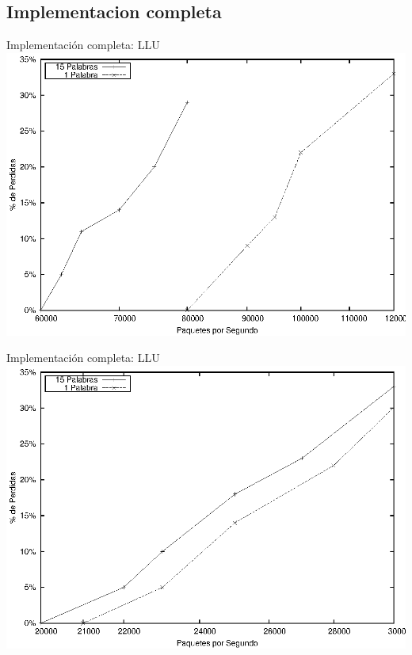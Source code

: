 \documentclass[xcolor=dvipsnames]{beamer}
\begin{document}
\subsection{Implementacion completa}
\begin{frame}{Implementación completa: LLU} 
\center	
\includegraphics[scale=0.70]{figures/llumin.eps} 
\end{frame}


\begin{frame}{Implementación completa: LLU} 
\center	
\includegraphics[scale=0.70]{figures/lluprom.eps} 
\end{frame}
\end{document}
